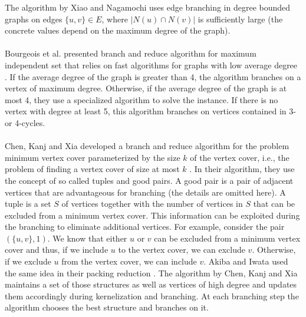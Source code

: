 \documentclass[]{article}
\begin{document}
The algorithm by Xiao and Nagamochi uses edge branching in degree bounded graphs on edges $\{u,v\}\in E$, where $|N(u)\cap N(v)|$ is sufficiently large (the concrete values depend on the maximum degree of the graph). \paragraph{}
Bourgeois et al. presented branch and reduce algorithm for maximum independent set that relies on fast algorithms for graphs with low average degree \cite{Bourgeois}. If the average degree of the graph is greater than 4, the algorithm branches on a vertex of maximum degree. Otherwise, if the average degree of the graph is at most 4, they use a specialized algorithm to solve the instance. If there is no vertex with degree at least 5, this algorithm branches on vertices contained in 3- or 4-cycles.\paragraph{}
Chen, Kanj and Xia developed a branch and reduce algorithm for the problem minimum vertex cover parameterized by the size $k$ of the vertex cover, i.e., the problem of finding a vertex cover of size at most $k$ \cite{ChenXiaKanj}. In their algorithm, they use the concept of so called tuples and good pairs. A good pair is a pair of adjacent vertices that are advantageous for branching (the details are omitted here). A tuple is a set $S$ of vertices together with the number of vertices in $S$ that can be excluded from a minimum vertex cover. This information can be exploited during the branching to eliminate additional vertices. For example, consider the pair $(\{u,v\}, 1)$. We know that either $u$ or $v$ can be excluded from a minimum vertex cover and thus, if we include $u$ to the vertex cover, we can exclude $v$. Otherwise, if we exclude $u$ from the vertex cover, we can include $v$. Akiba and Iwata used the same idea in their packing reduction \cite{AkibaIwata}. The algorithm by Chen, Kanj and Xia maintains a set of those structures as well as vertices of high degree and updates them accordingly during kernelization and branching. At each branching step the algorithm chooses the best structure and branches on it.\paragraph{}
\end{document}
